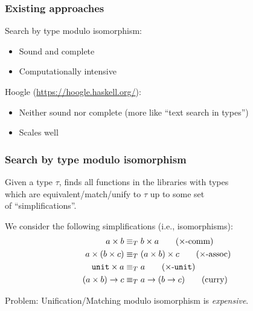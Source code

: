 \documentclass[aspectratio=169,dvipsnames,svgnames,10pt]{beamer}
\newcommand\Y{{\color{Green}{\ding{52}}}\xspace}
\newcommand\N{{\color{Red}{\ding{56}}}\xspace}
\begin{document}
\begin{frame}
  \frametitle{Existing approaches}

  {\large Search by type modulo isomorphism}:
  \begin{itemize}
  \item Sound and complete \Y
  \item Computationally intensive \N
  \end{itemize}

  \vfill

  {\large Hoogle} (\url{https://hoogle.haskell.org/}):
  \begin{itemize}
  \item Neither sound nor complete (more like ``text search in types'') \N
  \item Scales well \Y
  \end{itemize}
\end{frame}

\begin{frame}
  \frametitle{Search by type modulo isomorphism}

  Given a type $\tau$, finds all functions in the libraries with types \\
  which are equivalent/match/unify to $\tau$ up to some set\\
  of ``simplifications''.

  We consider the following simplifications (i.e., isomorphisms):
\begin{align}
    a \times b &\equiv_T
    b \times a
    \label{prod_comm}
    \tag{$\times$-comm}
  \\
    a \times (b \times c) &\equiv_T
    (a \times b) \times c
    \label{prod_assoc}
    \tag{$\times$-assoc}
  \\
    \texttt{unit} \times a &\equiv_T
    a
    \label{prod_unit}
    \tag{$\times$-$\texttt{unit}$}
  \\
    (a \times b) \rightarrow c &\equiv_T
    a \rightarrow (b \rightarrow c)
    \label{curry}
    \tag{curry}
\end{align}
  
  {\color{red} Problem}: Unification/Matching modulo isomorphism is \emph{expensive}.
\end{frame}
\end{document}
